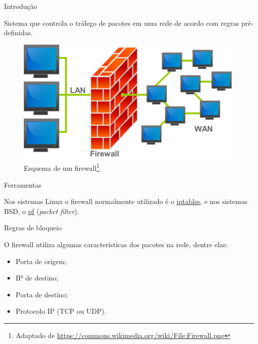 

\begin{frame}{Introdução}
  
Sistema que controla o tráfego de pacotes em uma rede de acordo com
regras pré-definidas.

\begin{figure}[ht]
\centering
\includegraphics[scale=.7]{firewall.png}
\caption{Esquema de um firewall\footnote{\scriptsize Adaptado de
    \url{https://commons.wikimedia.org/wiki/File:Firewall.png}}.}
\end{figure}

\end{frame}

\begin{frame}{Ferramentas}

  Nos sistemas Linux o firewall normalmente utilizado é o
  \href{http://www.netfilter.org/projects/iptables/}{iptables}, e nos
  sistemas BSD, o \href{http://www.openbsd.org/faq/pf/}{pf} ({\em packet
    filter}).

\end{frame}

\begin{frame}{Regras de bloqueio}

  O firewall utiliza algumas características dos pacotes na rede,
  dentre elas:

\begin{itemize}
\item Porta de origem;
\item IP de destino;
\item Porta de destino;
\item Protocolo IP (TCP ou UDP).
\end{itemize}

\end{frame}
